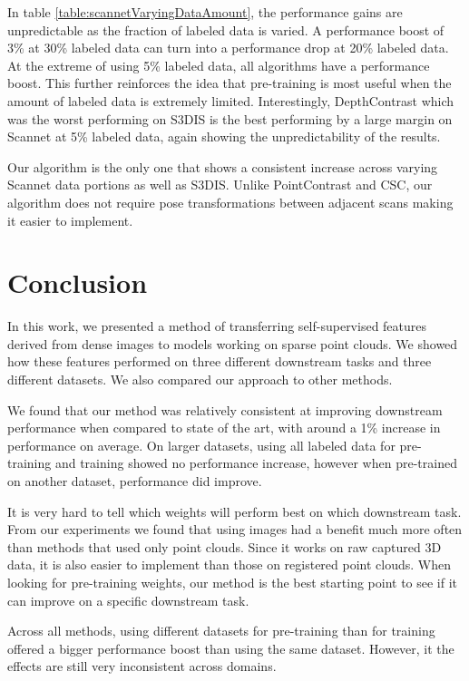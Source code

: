\documentclass[10pt,twocolumn,letterpaper]{article}
\begin{document}
In table \ref{table:scannetVaryingDataAmount}, the performance gains are unpredictable as the fraction of labeled data is varied. A performance boost of 3\% at 30\% labeled data can turn into a performance drop at 20\% labeled data. At the extreme of using 5\% labeled data, all algorithms have a performance boost. This further reinforces the idea that pre-training is most useful when the amount of labeled data is extremely limited. Interestingly, DepthContrast which was the worst performing on S3DIS is the best performing by a large margin on Scannet at 5\% labeled data, again showing the unpredictability of the results.

Our algorithm is the only one that shows a consistent increase across varying Scannet data portions as well as S3DIS. Unlike PointContrast and CSC, our algorithm does not require pose transformations between adjacent scans making it easier to implement.

\section{Conclusion}
\label{sec:conclusion}

In this work, we presented a method of transferring self-supervised features derived from dense images to models working on sparse point clouds. We showed how these features performed on three different downstream tasks and three different datasets. We also compared our approach to other methods.

We found that our method was relatively consistent at improving downstream performance when compared to state of the art, with around a 1\% increase in performance on average. On larger datasets, using all labeled data for pre-training and training showed no performance increase, however when pre-trained on another dataset, performance did improve.

It is very hard to tell which weights will perform best on which downstream task. From our experiments we found that using images had a benefit much more often than methods that used only point clouds. Since it works on raw captured 3D data, it is also easier to implement than those on registered point clouds. When looking for pre-training weights, our method is the best starting point to see if it can improve on a specific downstream task.

Across all methods, using different datasets for pre-training than for training offered a bigger performance boost than using the same dataset. However, it the effects are still very inconsistent across domains.
\end{document}
